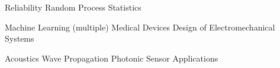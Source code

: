 
\begin{coursework}


  \cvcoursev
    {Reliability}
    {Random Process}
    {Statistics}

  \cvcoursev
    {Machine Learning (multiple)}
    {Medical Devices}
    {Design of Electromechanical Systems}
   
  \cvcoursev
    {Acoustics}
    {Wave Propagation}
    {Photonic Sensor Applications}
\end{coursework}
